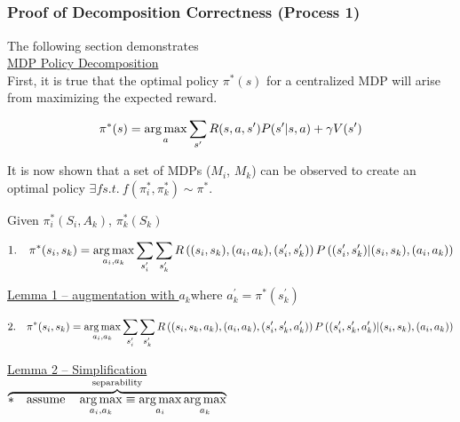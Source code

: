 \subsection{}

\subsubsection{Proof of Decomposition Correctness (Process 1)}

The following section demonstrates\\

\underline{MDP Policy Decomposition}\\

First, it is true that the optimal policy $\pi^\ast(s)$ for a centralized MDP will arise from maximizing the expected reward.

\begin{equation*}
\pi^\ast(s) = \operatorname*{arg\,max}_{a} \sum_{s^\prime} R(s,a,s^\prime) P(s^\prime |s, a) + \gamma V(s^\prime)
\end{equation*}

It is now shown that a set of MDPs ($M_i$, $M_k$) can be observed to create an optimal policy $\exists f s.t.\ f\left( \pi^\ast_i, \pi^\ast_k \right) \sim \pi^\ast$.

Given $\pi^\ast_i(S_i, A_k)$, $\pi^\ast_k(S_k)$

\begin{equation*}
1.\quad \pi^\ast(s_i,s_k) = \operatorname*{arg\,max}_{a_i, a_k} \sum_{s^\prime_i} \sum_{s^\prime_k} R\left( (s_i,s_k),(a_i,a_k),(s^\prime_i,s^\prime_k)\right) P\left( (s^\prime_i, s^\prime_k) \middle| (s_i, s_k), (a_i, a_k)  \right)
\end{equation*}

\textasteriskcentered \quad \underline{Lemma 1 -- augmentation with $a_k$}\quad where $a^\prime_k=\pi^\ast(s^\prime_k)$

\begin{equation*}
2.\quad\pi^\ast(s_i, s_k) = \operatorname*{arg\,max}_{a_i, a_k} \sum_{s^\prime_i} \sum_{s^\prime_k} R\left((s_i, s_k, a_k), (a_i,a_k),(s^\prime_i,s^\prime_k,a^\prime_k) \right) P\left( (s^\prime_i, s^\prime_k, a^\prime_k) \middle| (s_i, s_k), (a_i,a_k) \right) 
\end{equation*}

\textasteriskcentered \quad \underline{Lemma 2 -- Simplification}\\

$\overbrace{\ast\quad\text{assume} \quad \operatorname*{arg\,max}_{a_i,a_k} \equiv \operatorname*{arg\,max}_{a_i} \operatorname*{arg\,max}_{a_k}}^{\text{separability}}$\\

